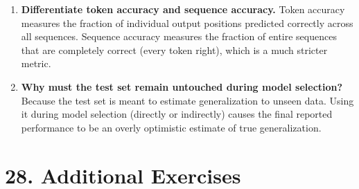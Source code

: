 \documentclass[10pt]{article}
\begin{document}
\begin{enumerate}
\item \textbf{Differentiate token accuracy and sequence accuracy.}
Token accuracy measures the fraction of individual output positions predicted correctly across all sequences. 
Sequence accuracy measures the fraction of entire sequences that are completely correct (every token right), 
which is a much stricter metric.

\item \textbf{Why must the test set remain untouched during model selection?}
Because the test set is meant to estimate generalization to unseen data. Using it during model selection 
(directly or indirectly) causes the final reported performance to be an overly optimistic estimate of true 
generalization.
\end{enumerate}

\section*{28. Additional Exercises}
\end{document}
